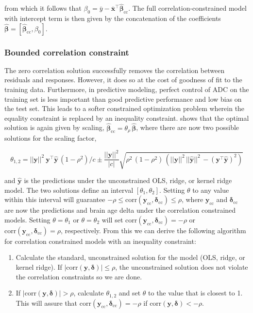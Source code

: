 \documentclass[utf8]{frontiersSCNS} %
\renewcommand{\a}{\theta}
\newcommand{\ar}{\a_\rho}
\newcommand{\bh}{\boldsymbol{\hat{\beta}}} %
\newcommand{\bcc}{\boldsymbol{\hat{\beta}}_\text{cc}} %
\newcommand{\corr}{\text{corr}}
\renewcommand{\d}{\boldsymbol{\delta}}
\newcommand{\mx}{\mathbf{\bar{x}}}
\newcommand{\my}{\bar{y}}
\newcommand{\y}{\mathbf{y}}
\newcommand{\yh}{\mathbf{\hat{y}}}
\begin{document}
from which it follows that $\beta_0 = \my - \mx^\top\bcc$. The full correlation-constrained model with intercept term is then given by the concatenation of the coefficients $\bh = [\bcc, \beta_0]$.

\subsubsection{Bounded correlation constraint}

The zero correlation solution successfully removes the correlation between residuals and responses. However, it does so at the cost of goodness of fit to the training data. Furthermore, in predictive modeling, perfect control of ADC on the training set is less important than good predictive performance and low bias on the test set. 
This leads to a softer constrained optimization problem wherein the equality constraint is replaced by an inequality constraint.  shows that the optimal solution is again given by scaling,  $\bcc = \ar\, \bh$, where there are now two possible solutions for the scaling factor,

\begin{equation*}
\a_{1,2} = ||\y||^2\ \y^\top\yh\,(1-\rho^2)/c \pm \frac{||\y||^2}{|c|}\sqrt{\rho^2\,(1-\rho^2)\,(||\y||^2\,||\yh||^2\,-(\y^\top\yh)^2)}
\end{equation*}

and $\yh$ is the predictions under the unconstrained OLS, ridge, or kernel ridge model. The two solutions define an interval $[\a_1, \a_2]$. Setting $\a$ to any value within this interval will guarantee $-\rho\le\corr(\y_\text{cc},\d_\text{cc})\le\rho$, where $\y_\text{cc}$ and $\d_\text{cc}$ are now the predictions and brain age delta under the correlation constrained models. Setting $\a = \a_1$ or $\a = \a_2$ will set $\corr(\y_\text{cc},\d_\text{cc})=-\rho$ or $\corr(\y_\text{cc},\d_\text{cc})=\rho$, respectively. From this we can derive the following algorithm for correlation  constrained models with an inequality constraint:


\begin{enumerate}
    \item Calculate the standard, unconstrained solution for the model (OLS, ridge, or kernel ridge). If $|\corr(\y,\d)|\le\rho$, the unconstrained solution does not violate the correlation constraints so we are done.
    \item If $|\corr(\y,\d)|>\rho$, calculate $\a_{1,2}$ and set $\a$ to the value that is closest to 1. This will assure that $\corr(\y_\text{cc},\d_\text{cc})=-\rho$ if $\corr(\y,\d)<-\rho$.
\end{enumerate}
\end{document}
